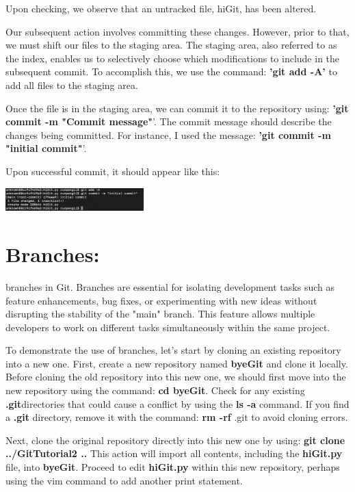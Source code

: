 \documentclass[10pt,twocolumn]{article}
\begin{document}
Upon checking, we observe that an untracked file, hiGit, has been altered.

Our subsequent action involves committing these changes. However, prior to that, we must shift our files to the staging area. The staging area, also referred to as the index, enables us to selectively choose which modifications to include in the subsequent commit. To accomplish this, we use the command: \textbf{'git add -A'} to add all files to the staging area.

Once the file is in the staging area, we can commit it to the repository using: \textbf{'git commit -m "Commit message"}'. The commit message should describe the changes being committed. For instance, I used the message: \textbf{'git commit -m "initial commit"}'.

Upon successful commit, it should appear like this:

\includegraphics[width = 0.4\textwidth]{Comm2.png}
 
\section{Branches:}

branches in Git. Branches are essential for isolating development tasks such as feature enhancements, bug fixes, or experimenting with new ideas without disrupting the stability of the "main" branch. This feature allows multiple developers to work on different tasks simultaneously within the same project.

To demonstrate the use of branches, let's start by cloning an existing repository into a new one. First, create a new repository named \textbf{byeGit} and clone it locally. Before cloning the old repository into this new one, we should first move into the new repository using the command: \textbf{cd byeGit}. Check for any existing \textbf{.git}directories that could cause a conflict by using the \textbf{ls -a} command. If you find a \textbf{.git} directory, remove it with the command: \textbf{rm -rf} .git to avoid cloning errors.

Next, clone the original repository directly into this new one by using: \textbf{git clone ../GitTutorial2 ..} This action will import all contents, including the \textbf{hiGit.py} file, into \textbf{byeGit}. Proceed to edit \textbf{hiGit.py} within this new repository, perhaps using the vim command to add another print statement.
\end{document}
